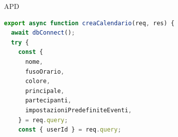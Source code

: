 \begin{listaPersonale} {APD}
\begin{listaPersonale2}[APD]{}

                \begin{lstlisting}[language=JavaScript]
export async function creaCalendario(req, res) {
  await dbConnect();
  try {
    const {
      nome,
      fusoOrario,
      colore,
      principale,
      partecipanti,
      impostazioniPredefiniteEventi,
    } = req.query;
    const { userId } = req.query;


\end{lstlisting}
\end{listaPersonale2}
\end{listaPersonale}
